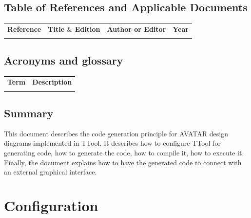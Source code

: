 \documentclass[12pt]{article}
\begin{document}
\subsection{Table of References and Applicable Documents}

\begin{table}[H]
\large
\centering
\begin{adjustbox}{width=\textwidth}
\begin{tabular}{ |p{2.66in}|p{2.66in}|p{0.95in}|p{0.43in}| }
\hhline{----}
\textbf{Reference} & \textbf{Title  $  \&  $  Edition} & \textbf{Author or
Editor} & \textbf{Year}
\\
\hhline{----}
 &  &  &  \\ 
\hline
\end{tabular}
\end{adjustbox}
\end{table}

\subsection{Acronyms and glossary}

\begin{table}[H]
\large
\centering
\begin{adjustbox}{width=\textwidth}
\begin{tabular}{ |p{1.24in}|p{5.45in}| }
\hhline{--}
\textbf{Term} & \textbf{Description} \\ 
\hhline{--}
 &  \\ 
\hline
\end{tabular}
\end{adjustbox}
\end{table}

\subsection{Summary}

This document describes the code generation principle for AVATAR design diagrams implemented in TTool. It describes how to configure TTool for generating code, how to generate the code, how to compile it, how to execute it.
Finally, the document explains how to have the generated code to connect with an external graphical interface.

\newpage

\section{Configuration}\label{sec:conf}
\end{document}
